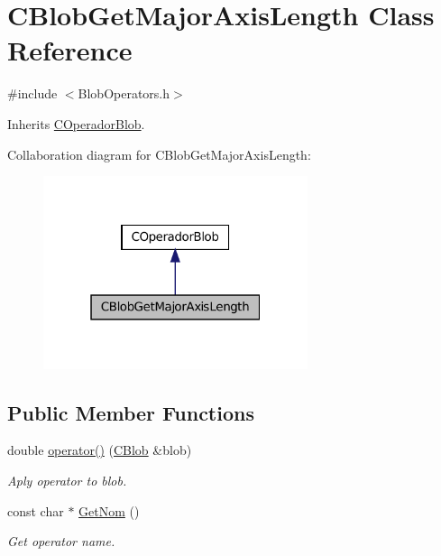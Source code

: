 \hypertarget{class_c_blob_get_major_axis_length}{
\section{CBlobGetMajorAxisLength Class Reference}
\label{class_c_blob_get_major_axis_length}
}


{\ttfamily \#include $<$BlobOperators.h$>$}



Inherits \hyperlink{class_c_operador_blob}{COperadorBlob}.



Collaboration diagram for CBlobGetMajorAxisLength:
\nopagebreak
\begin{figure}[H]
\begin{center}
\leavevmode
\includegraphics[width=220pt]{class_c_blob_get_major_axis_length__coll__graph}
\end{center}
\end{figure}
\subsection*{Public Member Functions}
\begin{DoxyCompactItemize}
\item 
double \hyperlink{class_c_blob_get_major_axis_length_a535c9a23d16bf020ed0c6aa9f36b884f}{operator()} (\hyperlink{class_c_blob}{CBlob} \&blob)
\begin{DoxyCompactList}\small\item\em Aply operator to blob. \item\end{DoxyCompactList}\item 
const char $\ast$ \hyperlink{class_c_blob_get_major_axis_length_a15cc57a607e31d659b0cf72caba17ffd}{GetNom} ()
\begin{DoxyCompactList}\small\item\em Get operator name. \item\end{DoxyCompactList}\end{DoxyCompactItemize}


